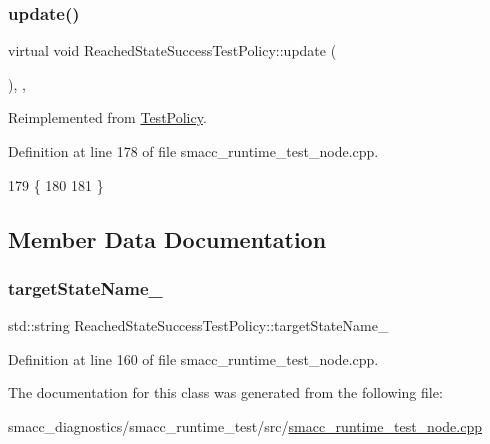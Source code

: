 \mbox{\label{classReachedStateSuccessTestPolicy_a34696eeabca13524db58dc8c72ffac6c}} 
\subsubsection{\texorpdfstring{update()}{update()}}
{\footnotesize\ttfamily virtual void Reached\+State\+Success\+Test\+Policy\+::update (\begin{DoxyParamCaption}{ }\end{DoxyParamCaption})\hspace{0.3cm}{\ttfamily [inline]}, {\ttfamily [private]}, {\ttfamily [virtual]}}



Reimplemented from \hyperlink{classTestPolicy_ae7a8f2ef3c4d513122ad20d5cffc88db}{Test\+Policy}.



Definition at line 178 of file smacc\+\_\+runtime\+\_\+test\+\_\+node.\+cpp.


\begin{DoxyCode}
179   \{
180   
181   \}
\end{DoxyCode}


\subsection{Member Data Documentation}
\mbox{\label{classReachedStateSuccessTestPolicy_a2dc3e3fae4d136b61ca9499eebb06ba2}} 
\subsubsection{\texorpdfstring{target\+State\+Name\+\_\+}{targetStateName\_}}
{\footnotesize\ttfamily std\+::string Reached\+State\+Success\+Test\+Policy\+::target\+State\+Name\+\_\+\hspace{0.3cm}{\ttfamily [private]}}



Definition at line 160 of file smacc\+\_\+runtime\+\_\+test\+\_\+node.\+cpp.



The documentation for this class was generated from the following file\+:\begin{DoxyCompactItemize}
\item 
smacc\+\_\+diagnostics/smacc\+\_\+runtime\+\_\+test/src/\hyperlink{smacc__runtime__test__node_8cpp}{smacc\+\_\+runtime\+\_\+test\+\_\+node.\+cpp}\end{DoxyCompactItemize}
